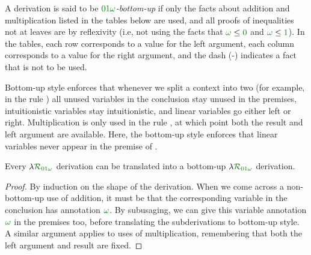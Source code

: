 \begin{definition}\label{def:DILL-bottom-up}
  A derivation is said to be \emph{$\instDILL$-bottom-up} if only the facts
  about addition and multiplication listed in the tables below are used,
  and all proofs of
  inequalities not at leaves are by reflexivity (i.e, not using the facts that
  $\gr\omega \leq \gr0$ and $\gr\omega \leq \gr1$).
  In the tables, each row corresponds to a value for the left argument, each
  column corresponds to a value for the right argument, and the dash (-)
  indicates a fact that is not to be used.

\end{definition}

Bottom-up style enforces that whenever we split a context into two (for
example, in the rule ) all unused variables in the
conclusion stay unused in the premises, intuitionistic variables stay
intuitionistic, and linear variables go either left or right.
Multiplication is only used in the rule , at which point
both the result and left argument are available.
Here, the bottom-up style enforces that linear variables never appear in the
premise of .

\begin{lemma}
  Every $\name_{\instDILL}$ derivation can be translated into a bottom-up
  $\name_{\instDILL}$ derivation.
\end{lemma}
\begin{proof}
  By induction on the shape of the derivation.
  When we come across a non-bottom-up use of addition, it must be that the
  corresponding variable in the conclusion has annotation $\gr\omega$.
  By subusaging, we can give this variable annotation $\gr\omega$ in
  the premises too, before translating the subderivations to bottom-up
  style.
  A similar argument applies to uses of multiplication, remembering that both
  the left argument and result are fixed.
\end{proof}

